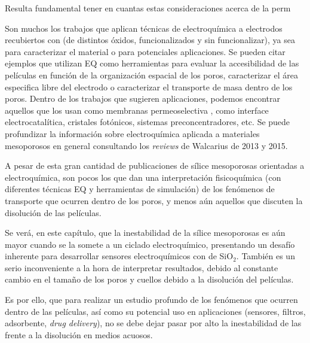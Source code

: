 	Resulta fundamental tener en cuantas estas consideraciones acerca de la perm	


	Son muchos los trabajos que aplican técnicas de electroquímica a electrodos recubiertos con \pdm\space (de distintos óxidos, funcionalizados y sin funcionalizar), ya sea para caracterizar el material o para potenciales aplicaciones. Se pueden citar ejemplos que utilizan EQ como herramientas para evaluar la accesibilidad de las películas en función de la organización espacial de los poros\cite{Etienne2007,Herzog2013,karman2016,}, caracterizar el área especifica libre del electrodo \cite{Otal2006} o caracterizar el transporte de masa dentro de los poros\cite{Calvo2009,brunsen2011}. Dentro de los trabajos que sugieren aplicaciones, podemos encontrar aquellos que los usan como membranas permeoselectiva \cite{Fattakhova-Rohlfing2007,Andrieu-Brunsen2015,Calvo2009}, como interface electrocatalítica\cite{BaeJ.HanJ.Chung2012}, cristales fotónicos\cite{Gimenez2017}, sistemas preconcentradores\cite{Etienne2015,Gimenez2016-2}, etc. Se puede profundizar la información sobre electroquímica aplicada a materiales mesoporosos en general consultando los \textit{reviews} de Walcarius de 2013\cite{walcarius2013,Etienne2013} y 2015\cite{Etienne2015}.

	A pesar de esta gran cantidad de publicaciones de sílice mesoporosas orientadas a electroquímica, son pocos los que dan una interpretación fisicoquímica (con diferentes técnicas EQ y herramientas de simulación) de los fenómenos de transporte que ocurren dentro de los poros, y menos aún aquellos que discuten la disolución de las películas. 

	Se verá, en este capítulo, que la inestabilidad de la sílice mesoporosas es aún mayor cuando se la somete a un ciclado electroquímico, presentando un desafío inherente para desarrollar sensores electroquímicos con \pdm\space de SiO$_2$. También es un serio inconveniente a la hora de interpretar resultados, debido al constante cambio en el tamaño de los poros y cuellos debido a la disolución del películas. 

	Es por ello, que para realizar un estudio profundo de los fenómenos que ocurren dentro de las películas, así como su potencial uso en aplicaciones (sensores, filtros, adsorbente, \textit{drug delivery}), no se debe dejar pasar por alto la inestabilidad de las \pdm\space frente a la disolución en medios acuosos.
	
